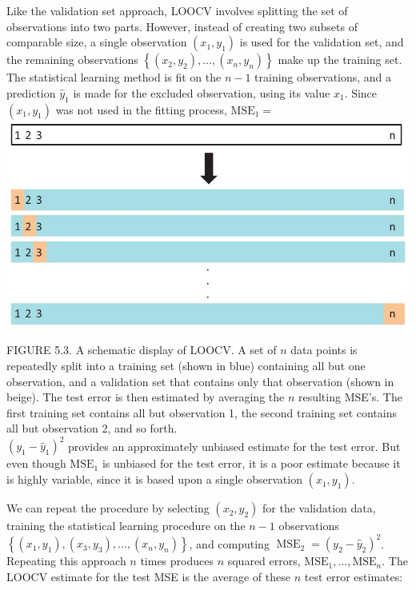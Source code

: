 \documentclass[10pt]{article}
\begin{document}
Like the validation set approach, LOOCV involves splitting the set of observations into two parts. However, instead of creating two subsets of comparable size, a single observation $\left(x_{1}, y_{1}\right)$ is used for the validation set, and the remaining observations $\left\{\left(x_{2}, y_{2}\right), \ldots,\left(x_{n}, y_{n}\right)\right\}$ make up the training set. The statistical learning method is fit on the $n-1$ training observations, and a prediction $\hat{y}_{1}$ is made for the excluded observation, using its value $x_{1}$. Since $\left(x_{1}, y_{1}\right)$ was not used in the fitting process, $\mathrm{MSE}_{1}=$\\
\includegraphics[max width=\textwidth, center]{2025_05_05_efe77898333945044de4g-194}

FIGURE 5.3. A schematic display of LOOCV. A set of $n$ data points is repeatedly split into a training set (shown in blue) containing all but one observation, and a validation set that contains only that observation (shown in beige). The test error is then estimated by averaging the $n$ resulting MSE's. The first training set contains all but observation 1, the second training set contains all but observation 2, and so forth.\\
$\left(y_{1}-\hat{y}_{1}\right)^{2}$ provides an approximately unbiased estimate for the test error. But even though $\mathrm{MSE}_{1}$ is unbiased for the test error, it is a poor estimate because it is highly variable, since it is based upon a single observation $\left(x_{1}, y_{1}\right)$.

We can repeat the procedure by selecting $\left(x_{2}, y_{2}\right)$ for the validation data, training the statistical learning procedure on the $n-1$ observations $\left\{\left(x_{1}, y_{1}\right),\left(x_{3}, y_{3}\right), \ldots,\left(x_{n}, y_{n}\right)\right\}$, and computing $\operatorname{MSE}_{2}=\left(y_{2}-\hat{y}_{2}\right)^{2}$. Repeating this approach $n$ times produces $n$ squared errors, $\mathrm{MSE}_{1}, \ldots, \mathrm{MSE}_{n}$. The LOOCV estimate for the test MSE is the average of these $n$ test error estimates:
\end{document}
